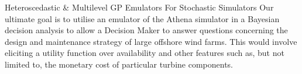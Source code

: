 \begin{chapter}{Heteroscedastic \& Multilevel GP Emulators For Stochastic Simulators\label{Ch:Hetsml}}
Our ultimate goal is to utilise an emulator of the Athena simulator in a Bayesian decision analysis to allow a Decision Maker to answer questions concerning the design and maintenance strategy of large offshore wind farms. This would involve eliciting a utility function over availability and other features such as, but not limited to, the monetary cost of particular turbine components.

\end{chapter}
